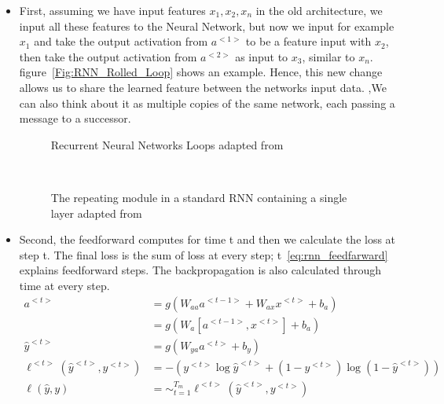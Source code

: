 \begin{itemize}
\item First, assuming we have input features $x_1, x_2, x_n$ in the old architecture, we input all these features to the Neural Network, but now we input for example $x_1$ and take the output activation from $a^{<1>}$ to be a feature input with $x_2$, then take the output activation from $a^{<2>}$ as input to $x_3$, similar to $x_n$. figure~\ref{Fig:RNN_Rolled_Loop} shows an example. Hence, this new change allows us to share the learned feature between the networks input data. ,We can also think about it as multiple copies of the same network, each passing a message to a successor\cite{colah}.%

\begin{figure}[!ht]
\minipage{\textwidth}
\centering

\endminipage\hfill
\caption{Recurrent Neural Networks Loops adapted from~\cite{colah}}\label{Fig:RNN_Rolled_Loop}

\endminipage\hfill
{}

\endminipage\hfill
{}%

\endminipage
\caption{The repeating module in a standard RNN containing a single layer adapted from~\cite{colah}}~\label{Fig:LSTM_SimpleRNN}

\end{figure}%

\item Second, the feedforward computes for time t and then we calculate the loss at step t. The final loss is the sum of loss at every step; t~\eqref{eq:rnn_feedfarward} explains feedforward steps. The backpropagation is also calculated through time at every step.%
\begin{subequations}\label{eq:rnn_feedfarward}
\begin{align}
 a^{<t>} & = g(W_{aa}a^{<t-1>}+ W_{ax}x^{<t>}+b_a)\\
  & = g(W_a[a^{<t-1>},x^{<t>}]+ b_a)\\
 \widehat{y}^{<t>} & = g(W_{ya}a^{<t>}+ b_y)
 \\ \ell^{<t>}(\widehat{y}^{<t>},y^{<t>}) & = - (y^{<t>} \log \widehat{y}^{<t>} + (1-y^{<t>}) \log (1-\widehat{y}^{<t>}))
\\ \ell(\widehat{y},y) & = \sim_{t=1}^{T_m} \ell^{<t>}(\widehat{y}^{<t>},y^{<t>})   
\end{align}
\end{subequations}%
 \end{itemize}


